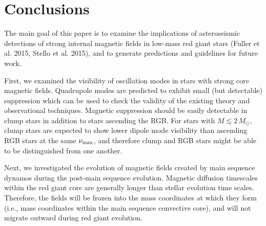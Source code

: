 \section{Conclusions}
\label{conclusion}

The main goal of this paper is to examine the implications of asteroseismic detections of strong internal magnetic fields in low-mass red giant stars (Fuller et al. 2015, Stello et al. 2015), and to generate predictions and guidelines for future work. 

First, we examined the visibility of oscillation modes in stars with strong core magnetic fields. Quadrupole modes are predicted to exhibit small (but detectable) suppression which can be used to check the validity of the existing theory and observational techniques. Magnetic suppression should be easily detectable in clump stars in addition to stars ascending the RGB. For stars with $M \lesssim 2 \, M_\odot$, clump stars are expected to show lower dipole mode visibility than ascending RGB stars at the same $\nu_{\rm max}$, and therefore clump and RGB stars might be able to be distinguished from one another.

Next, we investigated the evolution of magnetic fields created by main sequence dynamos during the post-main sequence evolution. Magnetic diffusion timescales within the red giant core are generally longer than stellar evolution time scales. Therefore, the fields will be frozen into the mass coordinates at which they form (i.e., mass coordinates within the main sequence convective core), and will not migrate outward during red giant evolution.


  
  